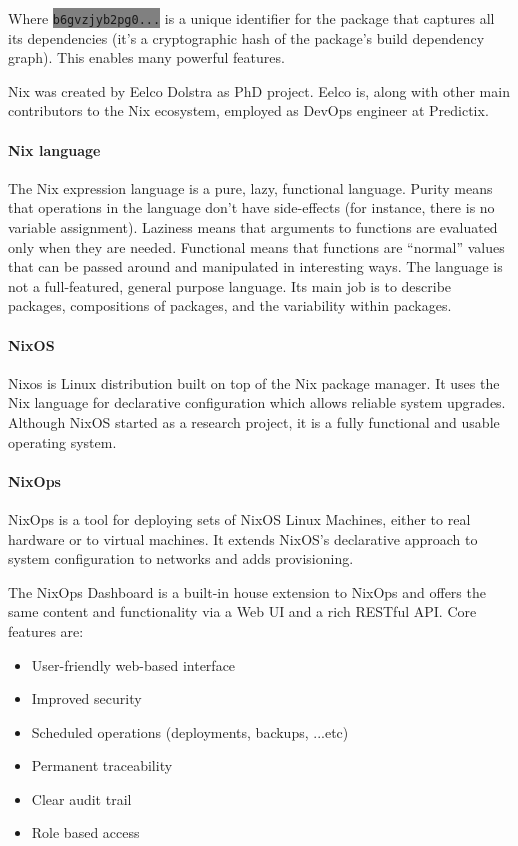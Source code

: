 Where \colorbox{Gray}{\lstinline{b6gvzjyb2pg0...}} is a unique identifier for the package that captures all its
dependencies (it’s a cryptographic hash of the package’s build dependency
graph). This enables many powerful features.

Nix was created by Eelco Dolstra as PhD project. Eelco is, along with other main
contributors to the Nix ecosystem, employed as DevOps engineer at Predictix.
\paragraph{Nix language}
The Nix expression language is a pure, lazy, functional language. Purity means
that operations in the language don't have side-effects (for instance, there is
no variable assignment). Laziness means that arguments to functions are
evaluated only when they are needed. Functional means that functions are
“normal” values that can be passed around and manipulated in interesting ways.
The language is not a full-featured, general purpose language. Its main job is
to describe packages, compositions of packages, and the variability within
packages.

\paragraph{NixOS}
Nixos is Linux distribution built on top of the Nix package manager. It
uses the Nix language for declarative configuration which allows reliable
system upgrades.
Although NixOS started as a research project, it is a fully functional and
usable operating system.

\paragraph{NixOps}
NixOps \cite{nixops}is a tool for deploying sets of NixOS Linux Machines, either to real
hardware or to virtual machines. It extends NixOS's declarative approach to
system configuration to networks and adds provisioning.

\par
The NixOps Dashboard is a built-in house extension to NixOps and offers the same
content and functionality via a Web UI and a rich RESTful API. Core features
are:

\begin{itemize}
\item User-friendly web-based interface
\item Improved security
\item Scheduled operations (deployments, backups, ...etc)
\item Permanent traceability
\item Clear audit trail
\item Role based access
\end{itemize}

